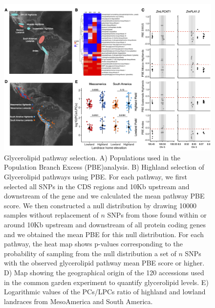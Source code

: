 \documentclass[9pt,twocolumn,twoside,lineno]{BioRxiv}
\begin{document}
\begin{figure}[h]
\begin{center}
\includegraphics[width=0.7\paperwidth]{Figures/Fig_1.png}
\caption{Glycerolipid pathway selection. 
A) Populations used in the Population Branch Excess (PBE)analysis. 
B) Highland selection of Glycerolipid pathways using PBE. 
For each pathway, we first selected all SNPs in the CDS regions and 10Kb upstream and downstream of the gene and we calculated the mean pathway PBE score. 
We then constructed a null distribution by drawing 10000 samples without replacement of $n$ SNPs from those found within or around 10Kb upstream and downstream of all protein coding genes and we obtained the mean PBE for this null distribution. 
For each pathway, the heat map shows p-values corresponding to the probability of sampling from the null distribution a set of $n$ SNPs with the observed glycerolipid pathway mean PBE score or higher.
D) Map showing the geographical origin of the 120 accessions used in the common garden experiment to quantify glycerolipid levels.
E) Logarithmic values of the PCs/LPCs ratio of highland and lowland landraces from MesoAmerica and South America.
} 
\label{Fig1}
\end{center}
\end{figure} 
\end{document}
